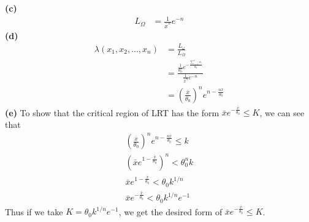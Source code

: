 \documentclass[answers,12pt,addpoints]{exam}
\begin{document}
\begin{questions}
\begin{solution}
        \textbf{(c)}
        \begin{align*}
            L_{\Omega} &= \frac{1}{\bar{x}^n} e^{-n}
        \end{align*}
        \textbf{(d)}
        \begin{align*}
            \lambda(x_1, x_2, \ldots, x_n) &= \frac{L_{\omega}}{L_{\Omega}} \\
            &= \frac{\frac{1}{\theta_0^n} e^{-\frac{\sum_{i=1}^{n} x_i}{\theta_0}}}{\frac{1}{\bar{x}^n} e^{-n}} \\
            &= \left(\frac{\bar{x}}{\theta_0}\right)^n e^{n - \frac{n\bar{x}}{\theta_0}}
        \end{align*}
        \textbf{(e)}
        To show that the critical region of LRT has the form $\bar{x} e^{-\frac{\bar{x}}{\theta_0}} \leq K$, we can see that 
        \begin{align*}
            \left(\frac{\bar{x}}{\theta_0}\right)^n e^{n - \frac{n\bar{x}}{\theta_0}} \leq k\\
            (\bar{x} e^{1-\frac{\bar{x}}{\theta_0}} )^n < \theta_0^n k\\
            \bar{x} e^{1-\frac{\bar{x}}{\theta_0}} < \theta_0 k^{1/n}\\
            \bar{x} e^{-\frac{\bar{x}}{\theta_0}} < \theta_0 k^{1/n}e^{-1}
        \end{align*}
        Thus if we take $K = \theta_0 k^{1/n}e^{-1}$, we get the desired form of
        $\bar{x} e^{-\frac{\bar{x}}{\theta_0}} \leq K$.


    \end{solution}


\end{questions}
\end{document}
